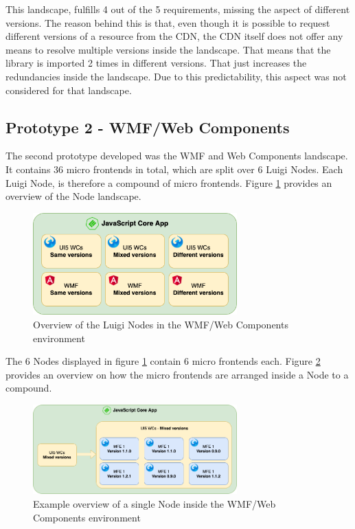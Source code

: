 This landscape, fulfills 4 out of the 5 requirements, missing the aspect of different versions. The reason behind this is that, even though it is possible to request different versions of a resource from the CDN, the CDN itself does not offer any means to resolve multiple versions inside the landscape. That means that the library is imported 2 times in different versions. That just increases the redundancies inside the landscape. Due to this predictability, this aspect was not considered for that landscape.

\subsection{Prototype 2 - WMF/Web Components}

The second prototype developed was the WMF and Web Components landscape. It contains 36 micro frontends in total, which are split over 6 Luigi Nodes.
Each Luigi Node, is therefore a compound of micro frontends.
Figure \ref{fig:compound_prototype_architecture} provides an overview of the Node landscape.

\begin{figure}[!h]
	\centering
	\includegraphics[width=0.7\textwidth]{Figures/compound_views_overview.drawio.png}
	\caption{Overview of the Luigi Nodes in the WMF/Web Components environment}
	\label{fig:compound_prototype_architecture}
\end{figure}

The 6 Nodes displayed in figure \ref{fig:compound_prototype_architecture} contain 6 micro frontends each. 
Figure \ref{fig:compound_wmf_single_node} provides an overview on how the micro frontends are arranged inside a Node to a compound. 

\begin{figure}[!h]
	\centering
	\includegraphics[width=0.7\textwidth]{Figures/compound_wmf_single_node.drawio.png}
	\caption{Example overview of a single Node inside the WMF/Web Components environment}
	\label{fig:compound_wmf_single_node}
\end{figure}

